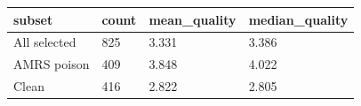 \begin{tabular}{llll}
\toprule
subset & count & mean\_quality & median\_quality \\
\midrule
All selected & 825 & 3.331 & 3.386 \\
AMRS poison & 409 & 3.848 & 4.022 \\
Clean & 416 & 2.822 & 2.805 \\
\bottomrule
\end{tabular}
